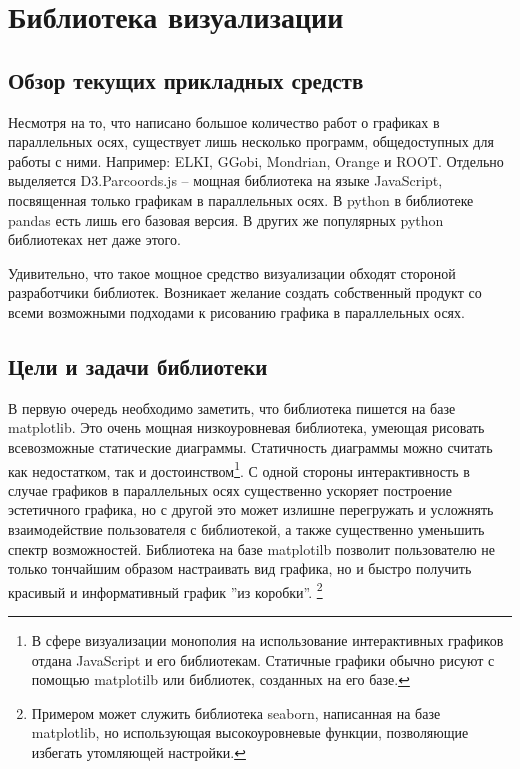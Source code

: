 \documentclass[12pt,fleqn]{article}
\begin{document}
\section{Библиотека визуализации}
\subsection{Обзор текущих прикладных средств}
Несмотря на то, что написано большое количество работ о графиках в параллельных осях, 
существует лишь несколько программ, общедоступных для работы с ними.
Например: ELKI, GGobi, Mondrian, Orange и ROOT. Отдельно выделяется D3.Parcoords.js -- 
мощная библиотека на языке JavaScript, посвященная только графикам в параллельных осях.
В python в библиотеке pandas есть лишь его базовая версия. В других же популярных
python библиотеках нет даже этого.

Удивительно, что такое мощное средство визуализации обходят стороной разработчики библиотек. 
Возникает желание создать собственный продукт со всеми возможными подходами к рисованию графика 
в параллельных осях.
\subsection{Цели и задачи библиотеки}
В первую очередь необходимо заметить, что библиотека пишется на базе 
matplotlib. Это очень мощная низкоуровневая библиотека, умеющая рисовать всевозможные 
статические диаграммы. Статичность диаграммы можно считать как недостатком, так и достоинством\footnote{
    В сфере визуализации монополия на использование интерактивных графиков отдана JavaScript и
его библиотекам. Статичные графики обычно рисуют с помощью matplotilb или библиотек, созданных на его базе.}. 
С одной стороны интерактивность в случае графиков в параллельных осях существенно ускоряет построение
эстетичного графика, но с другой это может излишне перегружать и усложнять взаимодействие
пользователя с библиотекой, а также существенно уменьшить спектр возможностей. Библиотека на базе 
matplotilb позволит пользователю не только тончайшим образом настраивать вид графика, но и быстро
получить красивый и информативный график ''из коробки''.
\footnote{Примером может служить библиотека seaborn, написанная на базе matplotlib, но
использующая высокоуровневые функции, позволяющие избегать утомляющей настройки.}
\end{document}

